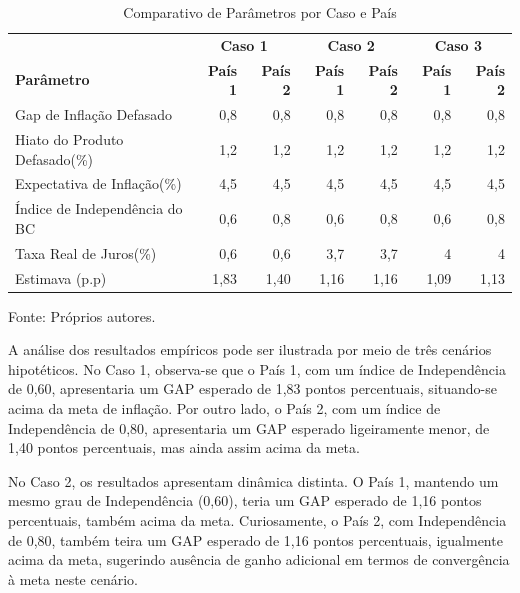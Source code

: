 \documentclass[a4paper,12pt]{article}
\begin{document}
\begin{table}[htbp]
    \centering
    \caption{Comparativo de Parâmetros por Caso e País} %
    \label{tab:comparative_cases}
    \begin{tabular}{l rr rr rr} %
        \toprule
        \multicolumn{1}{l}{\textbf{}} & \multicolumn{2}{c}{\textbf{Caso 1}} & \multicolumn{2}{c}{\textbf{Caso 2}} & \multicolumn{2}{c}{\textbf{Caso 3}} \\
        \cmidrule(lr){2-3} \cmidrule(lr){4-5} \cmidrule(lr){6-7}
        \textbf{Parâmetro} & \textbf{País 1} & \textbf{País 2} & \textbf{País 1} & \textbf{País 2} & \textbf{País 1} & \textbf{País 2} \\
        \midrule
        Gap de Inflação Defasado & 0,8 & 0,8 & 0,8 & 0,8 & 0,8 & 0,8 \\
        Hiato do Produto Defasado(\%) & 1,2 & 1,2 & 1,2 & 1,2 & 1,2 & 1,2 \\
        Expectativa de Inflação(\%) & 4,5 & 4,5 & 4,5 & 4,5 & 4,5 & 4,5 \\
        Índice de Independência do BC & 0,6 & 0,8 & 0,6 & 0,8 & 0,6 & 0,8 \\
        Taxa Real de Juros(\%) & 0,6 & 0,6 & 3,7 & 3,7 & 4 & 4 \\
        \midrule
        Estimava (p.p) & 1,83 & 1,40 & 1,16 & 1,16 & 1,09 & 1,13 \\
        \bottomrule
    \end{tabular}

        \footnotesize{Fonte: Próprios autores}.
\end{table}

A análise dos resultados empíricos pode ser ilustrada por meio de três cenários hipotéticos. No Caso 1, observa-se que o País 1, com um índice de Independência de 0,60, apresentaria um GAP esperado de 1,83 pontos percentuais, situando-se acima da meta de inflação. Por outro lado, o País 2, com um índice de Independência de 0,80, apresentaria um GAP esperado ligeiramente menor, de 1,40 pontos percentuais, mas ainda assim acima da meta.

No Caso 2, os resultados apresentam dinâmica distinta. O País 1, mantendo um mesmo grau de Independência (0,60), teria um GAP esperado de 1,16 pontos percentuais, também acima da meta. Curiosamente, o País 2, com Independência de 0,80, também teira um GAP esperado de 1,16 pontos percentuais, igualmente acima da meta, sugerindo ausência de ganho adicional em termos de convergência à meta neste cenário.
\end{document}
